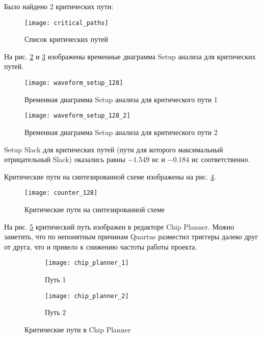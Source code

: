 Было найдено 2 критических пути:

\begin{figure}[H]
\begin{center}
	\texttt{[image: critical\_paths]}
	\caption{Список критических путей}
	\label{fig:critical_paths}
\end{center}
\end{figure}
\vspace{-0.7cm}

На рис. \ref{fig:waveform_setup_128} и \ref{fig:waveform_setup_128_2} изображены временные диаграмма Setup анализа для критических путей.

\vspace{-0.8cm}
\begin{figure}[H]
\begin{center}
	\texttt{[image: waveform\_setup\_128]}
	\caption{Временная диаграмма Setup анализа для критического пути 1}
	\label{fig:waveform_setup_128}
\end{center}
\end{figure}

\begin{figure}[H]
\begin{center}
	\texttt{[image: waveform\_setup\_128\_2]}
	\caption{Временная диаграмма Setup анализа для критического пути 2}
	\label{fig:waveform_setup_128_2}
\end{center}
\end{figure}

Setup Slack для критических путей (пути для которого максимальный отрицательный Slack) оказались равны $-1.549$ нс и $-0.184$ нс соответственно. 

Критические пути на синтезированной схеме изображены на рис. \ref{fig:counter_128}.

\begin{figure}[H]
\begin{center}
	\texttt{[image: counter\_128]}
	\caption{Критические пути на синтезированной схеме}
	\label{fig:counter_128}
\end{center}
\end{figure}

\newpage

На рис. \ref{fig:chip_planner} критический путь изображен в редакторе Chip Planner. Можно заметить, что по непонятным причинам Quartus разместил триггеры далеко друг от друга, что и привело к снижению частоты работы проекта.

\begin{figure}[H]
\begin{center}
	\begin{subfigure}[b]{0.49\textwidth}
		\texttt{[image: chip\_planner\_1]}
		\caption{Путь 1}
	\end{subfigure}
	\begin{subfigure}[b]{0.49\textwidth}
		\texttt{[image: chip\_planner\_2]}
		\caption{Путь 2}
	\end{subfigure}
	\caption{Критические пути в Chip Planner}
	\label{fig:chip_planner}
\end{center}
\end{figure}

